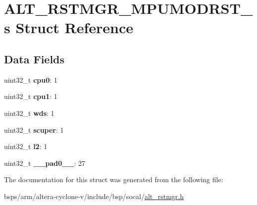 \hypertarget{structALT__RSTMGR__MPUMODRST__s}{}\section{A\+L\+T\+\_\+\+R\+S\+T\+M\+G\+R\+\_\+\+M\+P\+U\+M\+O\+D\+R\+S\+T\+\_\+s Struct Reference}
\label{structALT__RSTMGR__MPUMODRST__s}
\subsection*{Data Fields}
\begin{DoxyCompactItemize}
\item 
\mbox{\label{structALT__RSTMGR__MPUMODRST__s_a213fb76dcb9cf025d73743039004b414}} 
uint32\+\_\+t {\bfseries cpu0}\+: 1
\item 
\mbox{\label{structALT__RSTMGR__MPUMODRST__s_a051a4e34b9e309fe5ca888024dfa3e1f}} 
uint32\+\_\+t {\bfseries cpu1}\+: 1
\item 
\mbox{\label{structALT__RSTMGR__MPUMODRST__s_a1a155e7c4be88374af4bf58fde9d2e10}} 
uint32\+\_\+t {\bfseries wds}\+: 1
\item 
\mbox{\label{structALT__RSTMGR__MPUMODRST__s_ab769943e992939547dc4ad612ce42840}} 
uint32\+\_\+t {\bfseries scuper}\+: 1
\item 
\mbox{\label{structALT__RSTMGR__MPUMODRST__s_a9461f05da0d0284b9a0087d79eb35bc5}} 
uint32\+\_\+t {\bfseries l2}\+: 1
\item 
\mbox{\label{structALT__RSTMGR__MPUMODRST__s_aec315815582b45c96d6fedb29cebcbe2}} 
uint32\+\_\+t {\bfseries \+\_\+\+\_\+pad0\+\_\+\+\_\+}\+: 27
\end{DoxyCompactItemize}


The documentation for this struct was generated from the following file\+:\begin{DoxyCompactItemize}
\item 
bsps/arm/altera-\/cyclone-\/v/include/bsp/socal/\mbox{\hyperlink{alt__rstmgr_8h}{alt\+\_\+rstmgr.\+h}}\end{DoxyCompactItemize}

